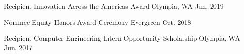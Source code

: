 



\begin{cvhonors}

  \cvhonor
	{Recipient} %
	{Innovation Across the Americas Award} %
	{Olympia, WA} %
	{Jun. 2019} %

  \cvhonor
    {Nominee} %
    {Equity Honors Award Ceremony} %
    {Evergreen} %
    {Oct. 2018} %

  \cvhonor
	{Recipient} %
	{Computer Engineering Intern Opportunity Scholarship} %
	{Olympia, WA} %
	{Jun. 2017} %

\end{cvhonors}
